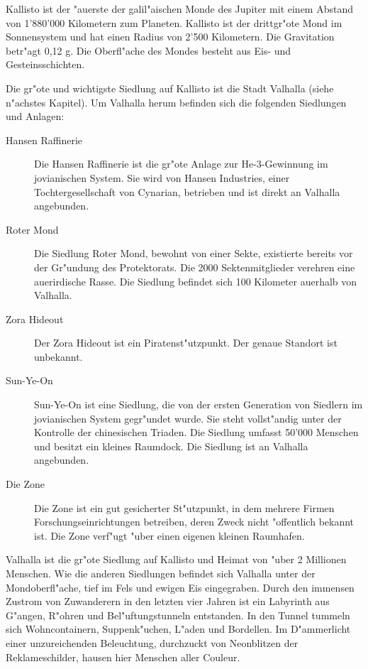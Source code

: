\clearpage\newpage



Kallisto ist der "au\3erste der galil"aischen Monde des Jupiter mit einem Abstand von 1'880'000 Kilometern zum Planeten. Kallisto ist der drittgr"o\3te Mond im Sonnensystem und hat einen Radius von 2'500 Kilometern. Die Gravitation betr"agt 0,12 g.  Die Oberfl"ache des Mondes besteht aus Eis- und Gesteinsschichten.

Die gr"o\3te und wichtigste Siedlung auf Kallisto ist die Stadt Valhalla (siehe n"achstes Kapitel). Um Valhalla herum befinden sich die folgenden Siedlungen und Anlagen:

\begin{description}
    \item[Hansen Raffinerie] Die Hansen Raffinerie ist die gr"o\3te Anlage zur He-3-Gewinnung im jovianischen System. Sie wird von Hansen 
        Industries, einer Tochtergesellschaft von Cynarian, betrieben und ist direkt an Valhalla angebunden.
    \item[Roter Mond] Die Siedlung Roter Mond, bewohnt von einer Sekte, existierte bereits vor der Gr"undung des Protektorats. Die 2000 
        Sektenmitglieder verehren eine au\3erirdische Rasse. Die Siedlung befindet sich 100 Kilometer au\3erhalb von Valhalla.
    \item[Zora Hideout] Der Zora Hideout ist ein Piratenst"utzpunkt. Der genaue Standort ist unbekannt.
    \item[Sun-Ye-On] Sun-Ye-On ist eine Siedlung, die von der ersten Generation von Siedlern im jovianischen System gegr"undet wurde. Sie 
        steht vollst"andig unter der Kontrolle der chinesischen Triaden. Die Siedlung umfasst 50'000 Menschen und besitzt ein kleines Raumdock. Die Siedlung ist an Valhalla angebunden.
    \item[Die Zone] Die Zone ist ein gut gesicherter St"utzpunkt, in dem mehrere Firmen Forschungseinrichtungen betreiben, deren Zweck nicht 
        "offentlich bekannt ist. Die Zone verf"ugt "uber einen eigenen kleinen Raumhafen.
\end{description}


Valhalla ist die gr"o\3te Siedlung auf Kallisto und Heimat von "uber 2 Millionen Menschen. Wie die anderen Siedlungen befindet sich Valhalla unter der Mondoberfl"ache, tief im Fels und ewigen Eis eingegraben. Durch den immensen Zustrom von Zuwanderern in den letzten vier Jahren ist ein Labyrinth aus G"angen, R"ohren und Bel"uftungstunneln entstanden. In den Tunnel tummeln sich Wohncontainern, Suppenk"uchen, L"aden und Bordellen. Im D"ammerlicht einer unzureichenden Beleuchtung, durchzuckt von Neonblitzen der Reklameschilder, hausen hier Menschen aller Couleur.

